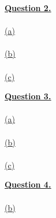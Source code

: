 \documentclass[12pt]{article}
\begin{document}
\hyperlink{toc}{\LARGE \underline{\textbf{Question 2.}}}\\
~\\\hyperlink{toc}{\hypertarget{2.1}{(a)}}\\
~\\\hyperlink{toc}{\hypertarget{2.2}{(b)}}\\
~\\\hyperlink{toc}{\hypertarget{2.3}{(c)}}\\
\newpage

\hyperlink{toc}{\LARGE \underline{\textbf{Question 3.}}}\\
~\\\hyperlink{toc}{\hypertarget{3.1}{(a)}}\\
~\\\hyperlink{toc}{\hypertarget{3.2}{(b)}}\\
~\\\hyperlink{toc}{\hypertarget{3.3}{(c)}}\\
\newpage

\hyperlink{toc}{\LARGE \underline{\textbf{Question 4.}}}\\
~\\\hyperlink{toc}{\hypertarget{4.2}{(b)}}\\
\end{document}
